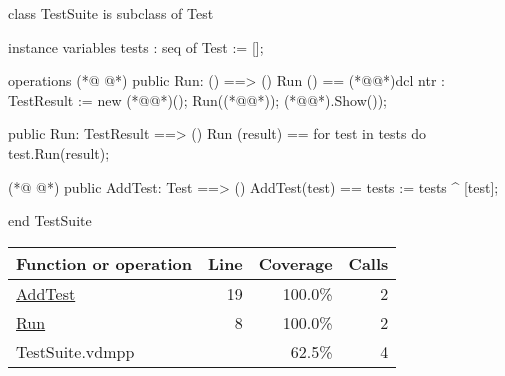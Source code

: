 \begin{vdmpp}[breaklines=true]
class TestSuite
  is subclass of Test

instance variables
  tests : seq of Test := [];

operations
(*@
\label{Run:8}
@*)
  public Run: () ==> ()
  Run () ==
    (*@\vdmnotcovered{(}@*)dcl ntr : TestResult := new (*@@*)();
     Run((*@@*));
     (*@@*).Show());

  public Run: TestResult ==> ()
  Run (result) ==
    for test in tests do
      test.Run(result);

(*@
\label{AddTest:19}
@*)
  public AddTest: Test ==> ()
  AddTest(test) ==
    tests := tests ^ [test];

end TestSuite
\end{vdmpp}
\bigskip
\begin{longtable}{|l|r|r|r|}
\hline
Function or operation & Line & Coverage & Calls \\
\hline
\hline
\hyperref[AddTest:19]{AddTest} & 19&100.0\% & 2 \\
\hline
\hyperref[Run:8]{Run} & 8&100.0\% & 2 \\
\hline
\hline
TestSuite.vdmpp & & 62.5\% & 4 \\
\hline
\end{longtable}

